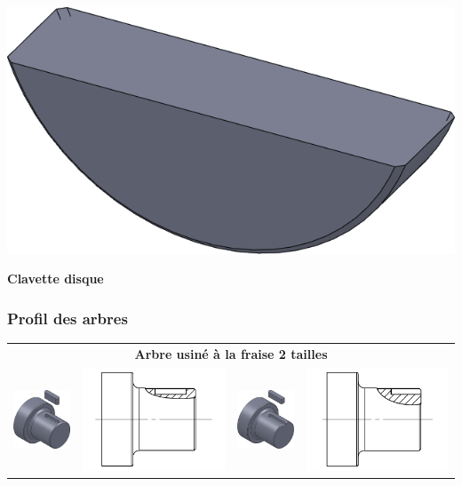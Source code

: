 \documentclass[11pt,oneside]{article}
\begin{document}
\begin{minipage}[c]{.22\linewidth}
\begin{center}
\includegraphics[width=.6\textwidth]{png/clavetted}

\textbf{Clavette disque}
\end{center}
\end{minipage}\hfill


\subsubsection{Profil des arbres}


\begin{center}
\begin{tabular}{m{2cm}m{5cm}m{2cm}m{5cm}}
\multicolumn{4}{c}{\textbf{Arbre usiné à la fraise 2 tailles}} \\
\includegraphics[width=2cm]{png/rainure1_3d}&
\includegraphics[width=5cm]{png/rainure1}&
\includegraphics[width=2cm]{png/rainure2_3d} &
\includegraphics[width=5cm]{png/rainure2}\\
\end{tabular}
\end{center}
\end{document}
